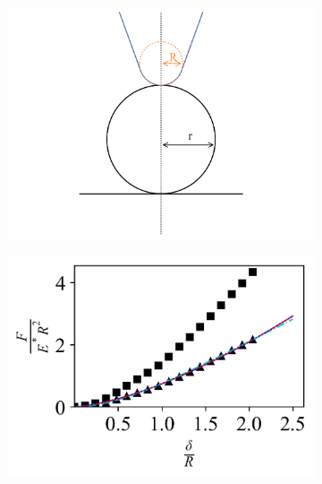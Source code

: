 \begin{figure}[H]
    \begin{subfigure}[t]{0.32\textwidth}
        \centering
        \caption{\label{fig: Capped-Sphere-Setup}}
        \includegraphics[width=1\linewidth]{Figures/Capped-Sphere-Setup.png}
    \end{subfigure}    
    \hfill
    \begin{subfigure}[t]{0.32\textwidth}
        \centering
        \caption{\label{fig: Capped-Sphere-Contact_Models}   }
        \includegraphics[width=1\linewidth]{Figures/Capped-Sphere-Contact_Models.png}
    \end{subfigure}
    \hfill
    \begin{subfigure}[t]{0.32\textwidth}
        \centering
        \caption{\label{fig: Capped-Sphere-Youngs_Modulus} }

\end{subfigure}
\end{figure}
